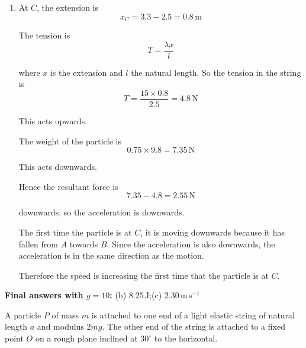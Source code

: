 \documentclass[leqno]{article}
\begin{document}
\begin{enumerate}[
  label=\textbf{\arabic*.},
  leftmargin=*,
  topsep=0pt,
  partopsep=0pt,
  parsep=0pt
]
\begin{djsSolution}
\begin{enumerate}[label=\textbf{(\alph*)}, start=1]
The work--energy principle is
\[
KE_0+GPE_0+EPE_0+\sum W_{\text{other}}=KE_1+GPE_1+EPE_1
\]

where state \(0\) is the particle at \(A\) and state \(1\) the particle at \(B\). No other force does work, so \(\sum W_{\text{other}}=0\). The particle is released from rest, so \(KE_A=0\). Also, from part (b), the loss in GPE from \(A\) to \(B\) is \(GPE_A-GPE_B=8.085\,\mathrm{J}\). Therefore
\[
KE_B=EPE_A+(GPE_A-GPE_B)-EPE_B
\]
\[
KE_B=0.48+8.085-6.75=1.815\,\mathrm{J}
\]

Now
\[
\frac12 \times 0.75\times v^2=1.815
\]

so
\[
v^2=\frac{2\times1.815}{0.75}=4.84
\]
\[
v=2.2\,\mathrm{m\,s^{-1}}
\]


  \item At \(C\), the extension is
\[
 x_C=3.3-2.5=0.8\,\mathrm{m}
\]

The tension is
\[
T=\frac{\lambda x}{l}
\]

where \(x\) is the extension and \(l\) the natural length. So the tension in the string is
\[
T=\frac{15\times 0.8}{2.5}=4.8\,\mathrm{N}
\]

This acts upwards.

The weight of the particle is
\[
0.75\times 9.8=7.35\,\mathrm{N}
\]

This acts downwards.

Hence the resultant force is
\[
7.35-4.8=2.55\,\mathrm{N}
\]

downwards, so the acceleration is downwards.

The first time the particle is at \(C\), it is moving downwards because it has fallen from \(A\) towards \(B\). Since the acceleration is also downwards, the acceleration is in the same direction as the motion.

Therefore the speed is increasing the first time that the particle is at \(C\).
\end{enumerate}
\par\medskip\noindent\textbf{Final answers with \(g = 10\):} (b) \(8.25\,\mathrm{J}\);\quad (c) \(2.30\,\mathrm{m\,s^{-1}}\)
\end{djsSolution}


\newpage

\questionitem

A particle $P$ of mass $m$ is attached to one end of a light elastic string of natural length $a$ and modulus $2mg$. The other end of the string is attached to a fixed point $O$ on a rough plane inclined at $30^\circ$ to the horizontal. \\


\end{enumerate}
\end{document}
